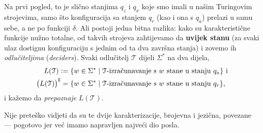 Na prvi pogled, to je slično stanjima $q_z$ i $q_x$ koje smo imali u našim Turingovim strojevima, samo što konfiguracija sa stanjem $q_r$ (kao i ona s $q_a$) prelazi u samu sebe, a ne po funkciji $\delta$. Ali postoji jedna bitna razlika: kako su karakteristične funkcije nužno totalne, od takvih strojeva zahtijevamo da \textbf{uvijek stanu} (za svaki ulaz dostignu konfiguraciju s jednim od ta dva završna stanja) i zovemo ih \emph{odlučiteljima} (\emph{deciders}). Svaki odlučitelj $\mathcal T$ dijeli $\Sigma^*$ na dva dijela,
\begin{align}
    L(\mathcal T):=\{w\in\Sigma^*&\mid\text{$\mathcal T$-izračunavanje s $w$ stane u stanju $q_a$}\}
    \text{ i}\\ \bigl(L(\mathcal T)\big)\sp{{\scriptscriptstyle\complement}}=\{w\in\Sigma^*&\mid\text{$\mathcal T$-izračunavanje s $w$ stane u stanju $q_r$}\}\text,
\end{align} i kažemo da \emph{prepoznaje} $L(\mathcal T)$.

Nije preteško vidjeti da su te dvije karakterizacije, brojevna i jezična, povezane --- pogotovo jer već imamo napravljen najveći dio posla.

